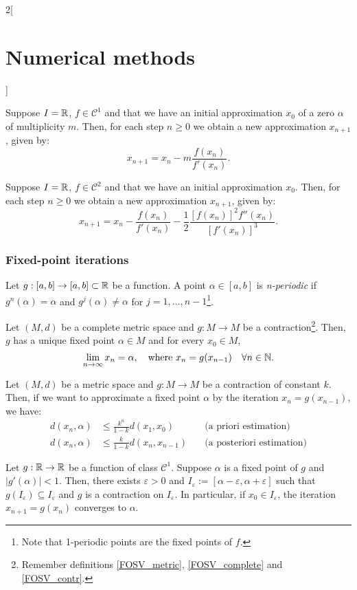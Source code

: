 \documentclass[../../../main.tex]{subfiles}
\begin{document}
\begin{multicols}{2}[\section{Numerical methods}]
\begin{method}
\end{method}
\begin{method}
    Suppose $I=\mathbb{R}$, $f\in\mathcal{C}^1$ and that we have an initial approximation $x_0$ of a zero $\alpha$ of multiplicity $m$. Then, for each step $n\geq 0$ we obtain a new approximation $x_{n+1}$, given by: $$x_{n+1}=x_n-m\frac{f(x_n)}{f'(x_n)}.$$
\end{method}
\begin{method}
    Suppose $I=\mathbb{R}$, $f\in\mathcal{C}^2$ and that we have an initial approximation $x_0$. Then, for each step $n\geq 0$ we obtain a new approximation $x_{n+1}$, given by: $$x_{n+1}=x_n-\frac{f(x_n)}{f'(x_n)}-\frac{1}{2}\frac{\left[f(x_n)\right]^2f''(x_n)}{\left[f'(x_n)\right]^3}.$$
\end{method}
\subsubsection*{Fixed-point iterations}
\begin{definition}
    Let $g:[a,b]\rightarrow[a,b]\subset\mathbb{R}$ be a function. A point $\alpha\in[a,b]$ is \textit{n-periodic} if $g^n(\alpha)=\alpha$ and $g^j(\alpha)\ne\alpha$ for $j=1,\ldots,n-1$\footnote{Note that 1-periodic points are the fixed points of $f$.}.
\end{definition}
\begin{theorem}
    Let $(M,d)$ be a complete metric space and $g:M\rightarrow M$ be a contraction\footnote{Remember definitions \ref{FOSV_metric}, \ref{FOSV_complete} and \ref{FOSV_contr}.}. Then, $g$ has a unique fixed point $\alpha\in M$ and for every $x_0\in M$, $$\lim_{n\to\infty}x_n=\alpha,\quad\text{where }x_n=g(x_{n-1})\quad\forall n\in\mathbb{N}.$$
\end{theorem}
\begin{prop}
    Let $(M,d)$ be a metric space and $g:M\rightarrow M$ be a contraction of constant $k$. Then, if we want to approximate a fixed point $\alpha$ by the iteration $x_n=g(x_{n-1})$, we have:
    \begin{align*}
        d(x_n,\alpha)&\leq\frac{k^n}{1-k}d(x_1,x_0)\quad&\text{(a priori estimation)}\\
        d(x_n,\alpha)&\leq\frac{k}{1-k}d(x_n,x_{n-1})\quad&\text{(a posteriori estimation)}
    \end{align*}
\end{prop}
\begin{corollary}
    Let $g:\mathbb{R}\rightarrow\mathbb{R}$ be a function of class $\mathcal{C}^1$. Suppose $\alpha$ is a fixed point of $g$ and $|g'(\alpha)|<1$. Then, there exists $\varepsilon>0$ and $I_\varepsilon:=[\alpha-\varepsilon,\alpha+\varepsilon]$ such that $g(I_\varepsilon)\subseteq I_\varepsilon$ and $g$ is a contraction on $I_\varepsilon$. In particular, if $x_0\in I_\varepsilon$, the iteration $x_{n+1}=g(x_n)$ converges to $\alpha$.

\end{corollary}
\end{multicols}
\end{document}
